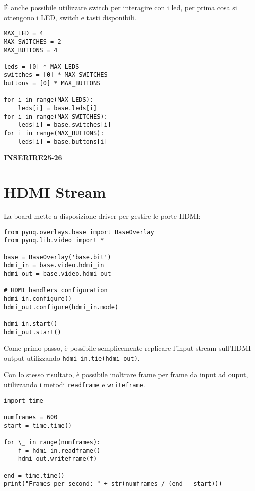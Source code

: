 É anche possibile utilizzare switch per interagire con i led, per prima cosa si ottengono i LED, switch e tasti disponibili.
\begin{verbatim}
MAX_LED = 4
MAX_SWITCHES = 2
MAX_BUTTONS = 4

leds = [0] * MAX_LEDS
switches = [0] * MAX_SWITCHES
buttons = [0] * MAX_BUTTONS

for i in range(MAX_LEDS):
    leds[i] = base.leds[i]
for i in range(MAX_SWITCHES):
    leds[i] = base.switches[i]
for i in range(MAX_BUTTONS):
    leds[i] = base.buttons[i]
\end{verbatim}
\textbf{INSERIRE25-26}

\section{HDMI Stream}
La board mette a disposizione driver per gestire le porte HDMI:
\begin{verbatim}
from pynq.overlays.base import BaseOverlay
from pynq.lib.video import *

base = BaseOverlay('base.bit')
hdmi_in = base.video.hdmi_in
hdmi_out = base.video.hdmi_out

# HDMI handlers configuration
hdmi_in.configure()
hdmi_out.configure(hdmi_in.mode)

hdmi_in.start()
hdmi_out.start()
\end{verbatim}

Come primo passo, è possibile semplicemente replicare l'input stream sull'HDMI output utilizzando \texttt{hdmi\_in.tie(hdmi\_out)}.

Con lo stesso risultato, è possibile inoltrare frame per frame da input ad ouput, utilizzando i metodi \texttt{readframe} e \texttt{writeframe}.
\begin{verbatim}
import time

numframes = 600
start = time.time()

for \_ in range(numframes):
    f = hdmi_in.readframe()
    hdmi_out.writeframe(f)

end = time.time()
print("Frames per second: " + str(numframes / (end - start)))
\end{verbatim}

